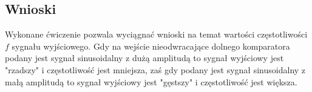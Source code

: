 \documentclass[12pt]{article}
\begin{document}
\subsection{Wnioski}
Wykonane ćwiczenie pozwala wyciągnać wnioski na temat wartości częstotliwości $f$ sygnału wyjściowego. Gdy na wejście nieodwracające dolnego komparatora podany jest sygnał sinusoidalny z dużą amplitudą to sygnał wyjściowy jest "rzadszy" i częstotliwość jest mniejsza, zaś gdy 
podany jest sygnał sinusoidalny z małą amplitudą to sygnał wyjściowy jest "gęstszy" i częstotliwość jest większa.
\end{document}
